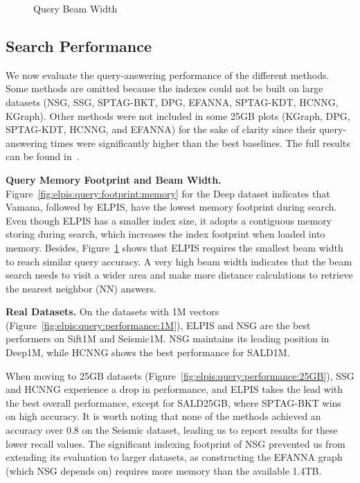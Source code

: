 \begin{figure}[!htb]
\begin{minipage}{0.28\textwidth}
\begin{subfigure}{\textwidth}
		\end{subfigure} 
		\caption{{Query Beam Width}}
		\label{fig:elpis:query:beam-width}
	\end{minipage}
\end{figure}

\subsection{Search Performance}
We now evaluate the query-answering performance of the different methods. Some methods are omitted because the indexes could not be built on large datasets (NSG, SSG, SPTAG-BKT, DPG, EFANNA, SPTAG-KDT, HCNNG, KGraph). Other methods were not included in some 25GB plots (KGraph, DPG, SPTAG-KDT, HCNNG, and EFANNA) for the sake of clarity since their query-answering times were significantly higher than the best baselines. The full results can be found in~\cite{url/GASS}.  

\noindent\textbf{Query Memory Footprint and Beam Width.} 
Figure~\ref{fig:elpis:query:footprint:memory} for the Deep dataset indicates that Vamana, followed by ELPIS, have the lowest memory footprint during search. Even though ELPIS has a smaller index size, it adopts a contiguous memory storing during search, which increases the index footprint when loaded into memory. Besides, Figure~\ref{fig:elpis:query:beam-width} shows that ELPIS requires the smallest beam width to reach similar query accuracy. A very high beam width indicates that the beam search needs to visit a wider area and make more distance calculations to retrieve the nearest neighbor (NN) answers.

\noindent\textbf{Real Datasets.}  On the datasets with 1M vectors (Figure~\ref{fig:elpis:query:performance:1M}), ELPIS and NSG are the best performers on Sift1M and Seismic1M. NSG maintains its leading position in Deep1M, while HCNNG shows the best performance for SALD1M. 

When moving to 25GB datasets (Figure~\ref{fig:elpis:query:performance:25GB}), SSG and HCNNG experience a drop in performance, and ELPIS takes the lead with the best overall performance, except for SALD25GB, where SPTAG-BKT wins on high accuracy. It is worth noting that none of the methods achieved an accuracy over 0.8 on the Seismic dataset, leading us to report results for these lower recall values. The significant indexing footprint of NSG prevented us from extending its evaluation to larger datasets, as constructing the EFANNA graph (which NSG depends on) requires more memory than the available 1.4TB. 

